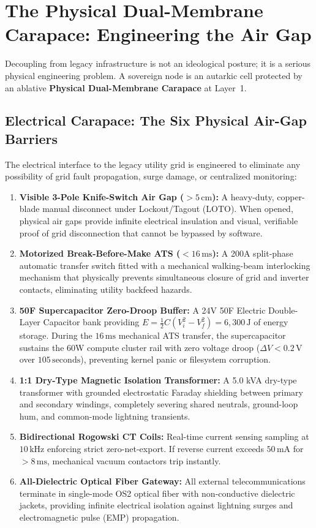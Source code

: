 \section{The Physical Dual-Membrane Carapace: Engineering the Air Gap}
\label{sec:physical_dual_membrane}

Decoupling from legacy infrastructure is not an ideological posture; it is a serious physical engineering problem. A sovereign node is an autarkic cell protected by an ablative \textbf{Physical Dual-Membrane Carapace} at Layer~1.

\subsection{Electrical Carapace: The Six Physical Air-Gap Barriers}
The electrical interface to the legacy utility grid is engineered to eliminate any possibility of grid fault propagation, surge damage, or centralized monitoring:
\begin{enumerate}
    \item \textbf{Visible 3-Pole Knife-Switch Air Gap ($>5\,\mathrm{cm}$):} A heavy-duty, copper-blade manual disconnect under Lockout/Tagout (LOTO). When opened, physical air gaps provide infinite electrical insulation and visual, verifiable proof of grid disconnection that cannot be bypassed by software.
    \item \textbf{Motorized Break-Before-Make ATS ($<16\,\mathrm{ms}$):} A 200A split-phase automatic transfer switch fitted with a mechanical walking-beam interlocking mechanism that physically prevents simultaneous closure of grid and inverter contacts, eliminating utility backfeed hazards.
    \item \textbf{50F Supercapacitor Zero-Droop Buffer:} A 24V 50F Electric Double-Layer Capacitor bank providing $E = \frac{1}{2} C (V_i^2 - V_f^2) = 6{,}300\,\mathrm{J}$ of energy storage. During the $16\,\mathrm{ms}$ mechanical ATS transfer, the supercapacitor sustains the 60W compute cluster rail with zero voltage droop ($\Delta V < 0.2\,\mathrm{V}$ over $105\,\mathrm{seconds}$), preventing kernel panic or filesystem corruption.
    \item \textbf{1:1 Dry-Type Magnetic Isolation Transformer:} A 5.0 kVA dry-type transformer with grounded electrostatic Faraday shielding between primary and secondary windings, completely severing shared neutrals, ground-loop hum, and common-mode lightning transients.
    \item \textbf{Bidirectional Rogowski CT Coils:} Real-time current sensing sampling at $10\,\mathrm{kHz}$ enforcing strict zero-net-export. If reverse current exceeds $50\,\mathrm{mA}$ for $>8\,\mathrm{ms}$, mechanical vacuum contactors trip instantly.
    \item \textbf{All-Dielectric Optical Fiber Gateway:} All external telecommunications terminate in single-mode OS2 optical fiber with non-conductive dielectric jackets, providing infinite electrical isolation against lightning surges and electromagnetic pulse (EMP) propagation.
\end{enumerate}

